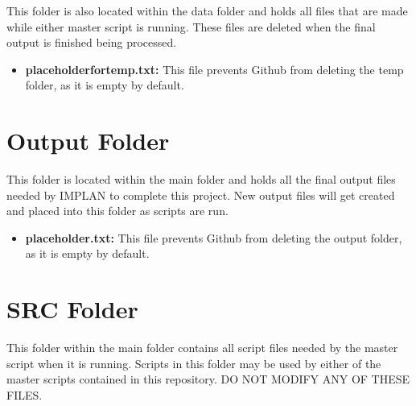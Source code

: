 \documentclass[
]{book}
\providecommand{\tightlist}{%
  \setlength{\itemsep}{0pt}\setlength{\parskip}{0pt}}
\begin{document}
This folder is also located within the data folder and holds all files that are made while either master script is running. These files are deleted when the final output is finished being processed.

\begin{itemize}
\tightlist
\item
  \textbf{placeholderfortemp.txt:} This file prevents Github from deleting the temp folder, as it is empty by default.
\end{itemize}

\hypertarget{output-folder}{%
\section{Output Folder}\label{output-folder}}

This folder is located within the main folder and holds all the final output files needed by IMPLAN to complete this project. New output files will get created and placed into this folder as scripts are run.

\begin{itemize}
\tightlist
\item
  \textbf{placeholder.txt:} This file prevents Github from deleting the output folder, as it is empty by default.
\end{itemize}

\hypertarget{src-folder}{%
\section{SRC Folder}\label{src-folder}}

This folder within the main folder contains all script files needed by the master script when it is running. Scripts in this folder may be used by either of the master scripts contained in this repository. DO NOT MODIFY ANY OF THESE FILES.
\end{document}
